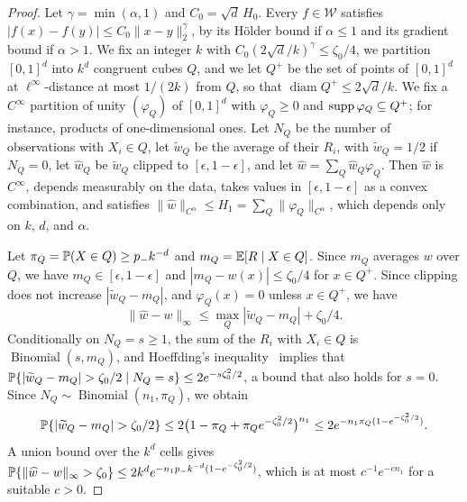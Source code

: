 \begin{proof}
Let $\gamma=\min(\alpha,1)$ and $C_0=\sqrt d\,H_0$. Every
$f\in\mathcal W$ satisfies $|f(x)-f(y)|\le C_0\|x-y\|_2^\gamma$, by its
H\"older bound if $\alpha\le1$ and its gradient bound if $\alpha>1$. We
fix an integer $k$ with $C_0(2\sqrt d/k)^\gamma\le\zeta_0/4$, we
partition $[0,1]^d$ into $k^d$ congruent cubes $Q$, and we let $Q^+$ be
the set of points of $[0,1]^d$ at $\ell^\infty$-distance at most
$1/(2k)$ from $Q$, so that $\operatorname{diam}Q^+\le2\sqrt d/k$. We
fix a $C^\infty$ partition of unity $(\varphi_Q)$ of $[0,1]^d$ with
$\varphi_Q\ge0$ and $\operatorname{supp}\varphi_Q\subseteq Q^+$; for instance,
products of one-dimensional ones. Let $N_Q$ be the number of
observations with $X_i\in Q$, let $\widetilde w_Q$ be the average of
their $R_i$, with $\widetilde w_Q=1/2$ if $N_Q=0$, let
$\widehat w_Q$ be $\widetilde w_Q$ clipped to $[\epsilon,1-\epsilon]$,
and let $\widehat w=\sum_Q\widehat w_Q\varphi_Q$. Then $\widehat w$ is
$C^\infty$, depends measurably on the data, takes values in
$[\epsilon,1-\epsilon]$ as a convex combination, and satisfies
$\|\widehat w\|_{C^\alpha}\le H_1=\sum_Q\|\varphi_Q\|_{C^\alpha}$,
which depends only on $k$, $d$, and $\alpha$.

Let $\pi_Q=\mathbb P(X\in Q)\ge p_-k^{-d}$ and $m_Q=\mathbb E[R\mid X\in Q]$. Since
$m_Q$ averages $w$ over $Q$, we have
$m_Q\in[\epsilon,1-\epsilon]$ and $|m_Q-w(x)|\le\zeta_0/4$ for
$x\in Q^+$. Since clipping does not increase $|\widetilde w_Q-m_Q|$,
and $\varphi_Q(x)=0$ unless $x\in Q^+$, we have
\[
 \|\widehat w-w\|_\infty\le\max_Q|\widetilde w_Q-m_Q|+\zeta_0/4 .
\]
Conditionally on $N_Q=s\ge1$, the sum of the $R_i$ with $X_i\in Q$ is
$\operatorname{Binomial}(s,m_Q)$, and Hoeffding's
inequality~\cite[Theorem~1]{hoeffding1963} implies that
$\Pp\{|\widetilde w_Q-m_Q|>\zeta_0/2\mid N_Q=s\}\le2e^{-s\zeta_0^2/2}$,
a bound that also holds for $s=0$. Since
$N_Q\sim\operatorname{Binomial}(n_1,\pi_Q)$, we obtain
\[
 \Pp\{|\widetilde w_Q-m_Q|>\zeta_0/2\}
 \le2\bigl(1-\pi_Q+\pi_Qe^{-\zeta_0^2/2}\bigr)^{n_1}
 \le2e^{-n_1\pi_Q(1-e^{-\zeta_0^2/2})}.
\]
A union bound over the $k^d$ cells gives
$\mathbb P\{\|\widehat w-w\|_\infty>\zeta_0\}
\le2k^de^{-n_1p_-k^{-d}(1-e^{-\zeta_0^2/2})}$, which is at most
$c^{-1}e^{-cn_1}$ for a suitable $c>0$.
\end{proof}

